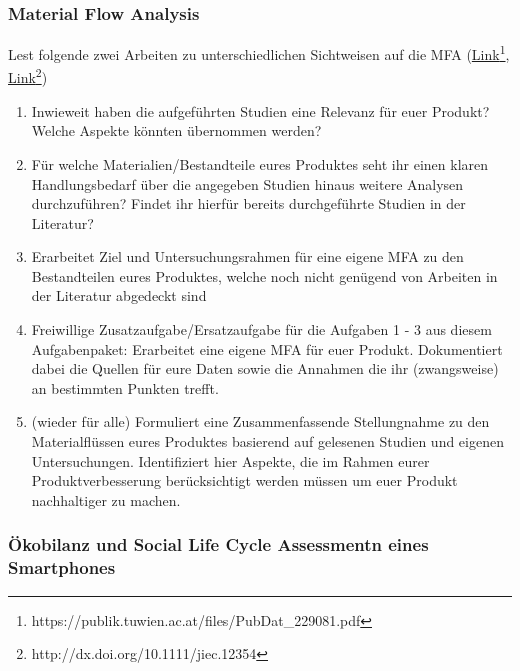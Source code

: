 \documentclass[headinclude=true]{scrartcl}
\begin{document}
\subsubsection{Material Flow Analysis}

Lest folgende zwei Arbeiten zu unterschiedlichen Sichtweisen auf die MFA (\href{https://publik.tuwien.ac.at/files/PubDat_229081.pdf}{Link\footnote{\url{https://publik.tuwien.ac.at/files/PubDat_229081.pdf}}}, \href{http://dx.doi.org/10.1111/jiec.12354}{Link\footnote{\url{http://dx.doi.org/10.1111/jiec.12354}}})

	      \begin{enumerate}
		      \item
		            Inwieweit haben die aufgeführten Studien eine Relevanz für euer Produkt? Welche Aspekte könnten übernommen werden?
		     
		      \item
		            Für welche Materialien/Bestandteile eures Produktes seht ihr einen klaren Handlungsbedarf über die angegeben Studien hinaus weitere Analysen durchzuführen? Findet ihr hierfür bereits durchgeführte Studien in der Literatur?
                \item
            	      Erarbeitet Ziel und Untersuchungsrahmen für eine eigene MFA zu den Bestandteilen eures Produktes, welche noch nicht genügend von Arbeiten in der Literatur abgedeckt sind
            	      
    	      \item
    	           Freiwillige Zusatzaufgabe/Ersatzaufgabe für die Aufgaben 1 - 3 aus diesem Aufgabenpaket: Erarbeitet eine eigene MFA für euer Produkt. Dokumentiert dabei die Quellen für eure Daten sowie die Annahmen die ihr (zwangsweise) an bestimmten Punkten trefft.
        	      
    	      \item 
    	            (wieder für alle) Formuliert eine Zusammenfassende Stellungnahme zu den Materialflüssen eures Produktes basierend auf gelesenen Studien und eigenen Untersuchungen. Identifiziert hier Aspekte, die im Rahmen eurer Produktverbesserung berücksichtigt werden müssen um euer Produkt nachhaltiger zu machen.
	      \end{enumerate}
	

\subsubsection{Ökobilanz und Social Life Cycle Assessmentn eines Smartphones}
\label{ökobilanz}
\end{document}
